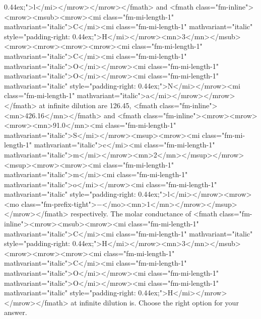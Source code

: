 \documentclass{article}
\begin{document}
0.44ex;">l</mi></mrow></mrow></fmath> and <fmath class="fm-inline"><mrow><msub><mrow><mi class="fm-mi-length-1" mathvariant="italic">C</mi><mi class="fm-mi-length-1" mathvariant="italic" style="padding-right: 0.44ex;">H</mi></mrow><mn>3</mn></msub><mrow><mrow><mrow><mrow><mi class="fm-mi-length-1" mathvariant="italic">C</mi><mi class="fm-mi-length-1" mathvariant="italic">O</mi></mrow><mi class="fm-mi-length-1" mathvariant="italic">O</mi></mrow><mi class="fm-mi-length-1" mathvariant="italic" style="padding-right: 0.44ex;">N</mi></mrow><mi class="fm-mi-length-1" mathvariant="italic">a</mi></mrow></mrow></fmath> at infinite dilution are 126.45, <fmath class="fm-inline"><mn>426.16</mn></fmath> and <fmath class="fm-inline"><mrow><mrow><mrow><mn>91.0</mn><mi class="fm-mi-length-1" mathvariant="italic">S</mi></mrow><msup><mrow><mi class="fm-mi-length-1" mathvariant="italic">c</mi><mi class="fm-mi-length-1" mathvariant="italic">m</mi></mrow><mn>2</mn></msup></mrow><msup><mrow><mrow><mi class="fm-mi-length-1" mathvariant="italic">m</mi><mi class="fm-mi-length-1" mathvariant="italic">o</mi></mrow><mi class="fm-mi-length-1" mathvariant="italic" style="padding-right: 0.44ex;">l</mi></mrow><mrow><mo class="fm-prefix-tight">−</mo><mn>1</mn></mrow></msup></mrow></fmath> respectively. The molar conductance of <fmath class="fm-inline"><mrow><msub><mrow><mi class="fm-mi-length-1" mathvariant="italic">C</mi><mi class="fm-mi-length-1" mathvariant="italic" style="padding-right: 0.44ex;">H</mi></mrow><mn>3</mn></msub><mrow><mrow><mrow><mi class="fm-mi-length-1" mathvariant="italic">C</mi><mi class="fm-mi-length-1" mathvariant="italic">O</mi></mrow><mi class="fm-mi-length-1" mathvariant="italic">O</mi></mrow><mi class="fm-mi-length-1" mathvariant="italic" style="padding-right: 0.44ex;">H</mi></mrow></mrow></fmath> at infinite dilution is. Choose the right option for your answer.
\end{document}

